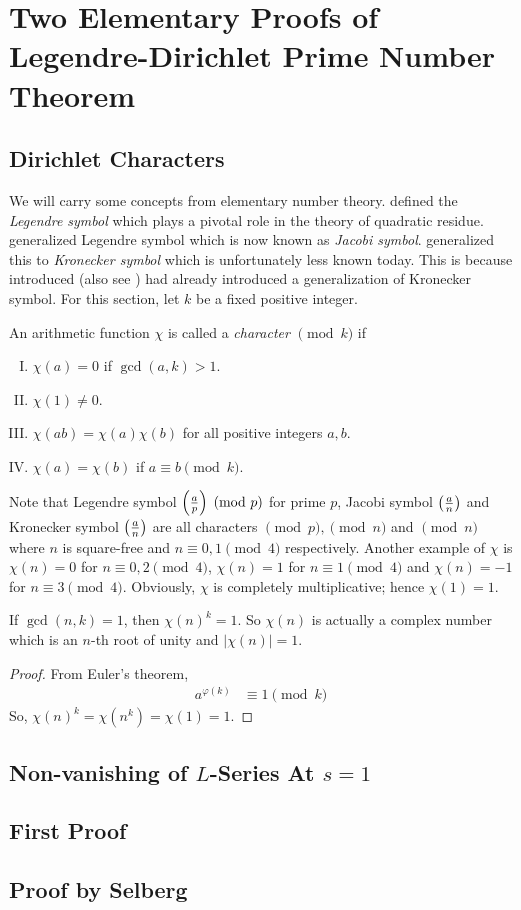 \documentclass[elemannt.tex]{subfile}
\begin{document}
	\chapter{Two Elementary Proofs of Legendre-Dirichlet Prime Number Theorem}\label{ch:legendre}
	\section{Dirichlet Characters}
	We will carry some concepts from elementary number theory. \textcite[pp. 186]{legendre_1798} defined the \textit{Legendre symbol} which plays a pivotal role in the theory of quadratic residue. \textcite{jacobi_1846} generalized Legendre symbol which is now known as \textit{Jacobi symbol}. \textcite[pp. 770]{kronecker_1885} generalized this to \textit{Kronecker symbol} which is unfortunately less known today. This is because \textcite{dirichlet_1837} introduced (also see \textcite{dirichlet_1897_21}) had already introduced a generalization of Kronecker symbol. For this section, let $k$ be a fixed positive integer.
		\begin{definition}
			An arithmetic function $\chi$ is called a \textit{character} $\pmod{k}$ if
				\begin{enumerate}[(I)]
					\item $\chi(a)=0$ if $\gcd(a,k)>1$.
					\item $\chi(1)\neq0$.
					\item $\chi(ab)=\chi(a)\chi(b)$ for all positive integers $a,b$.
					\item $\chi(a)=\chi(b)$ if $a\equiv b\pmod{k}$.
				\end{enumerate}
		\end{definition}
	Note that Legendre symbol $\func{}{\frac{a}{p}}\pmod{p}$ for prime $p$, Jacobi symbol $\func{}{\frac{a}{n}}$ and Kronecker symbol $\func{}{\frac{a}{n}}$ are all characters $\pmod{p},\pmod{n}$ and $\pmod{n}$ where $n$ is square-free and $n\equiv0,1\pmod{4}$ respectively. Another example of $\chi$ is $\chi(n)=0$ for $n\equiv0,2\pmod{4}$, $\chi(n)=1$ for $n\equiv1\pmod4$ and $\chi(n)=-1$ for $n\equiv3\pmod{4}$. Obviously, $\chi$ is completely multiplicative; hence $\chi(1)=1$.
		\begin{theorem}
			If $\gcd(n,k)=1$, then $\chi(n)^{k}=1$. So $\chi(n)$ is actually a complex number which is an $n$-th root of unity and $|\chi(n)|=1$.
		\end{theorem}
	
		\begin{proof}
			From Euler's theorem,
				\begin{align*}
					a^{\varphi(k)}
						& \equiv1\pmod{k}
				\end{align*}
			So, $\chi(n)^{k}=\chi(n^{k})=\chi(1)=1$.
		\end{proof}
	
		\begin{theorem}
			
		\end{theorem}
	\section{Non-vanishing of $L$-Series At $s=1$}
	\section{First Proof}
	\section{Proof by Selberg}
\end{document}
